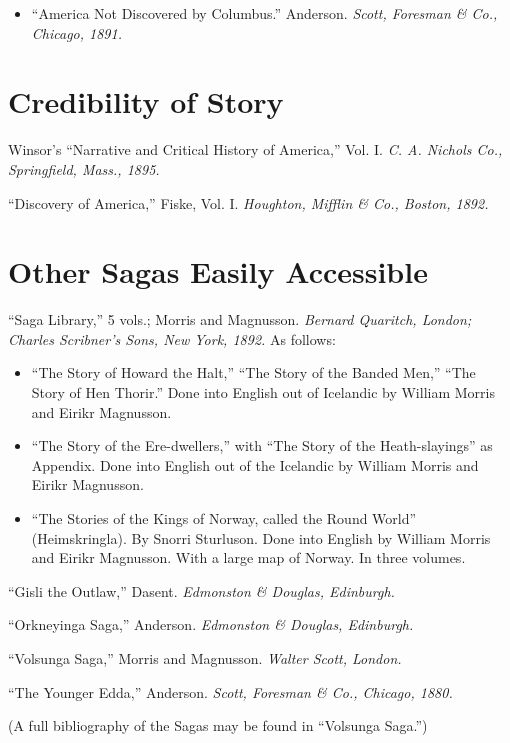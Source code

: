 \begin{itemize}
\item ``America Not Discovered by Columbus.'' Anderson. \emph{Scott, Foresman \&
Co., Chicago, 1891.}
\end{itemize}

\section*{Credibility of Story}

Winsor's ``Narrative and Critical History of America,'' Vol. I. \emph{C.
A. Nichols Co., Springfield, Mass., 1895.}

\noindent ``Discovery of America,'' Fiske, Vol. I. \emph{Houghton,
Mifflin \& Co., Boston, 1892.}

\section*{Other Sagas Easily Accessible}

``Saga Library,'' 5 vols.; Morris and Magnusson. \emph{Bernard Quaritch,
London; Charles Scribner's Sons, New York, 1892.} As follows:

\begin{itemize}[itemsep=0pt]
\item ``The Story of Howard the Halt,'' ``The Story of the Banded Men,'' ``The
Story of Hen Thorir.'' Done into English out of Icelandic by William
Morris and Eirikr Magnusson.
\item ``The Story of the Ere-dwellers,'' with ``The Story of the
Heath-slayings'' as Appendix. Done into English out of the Icelandic
by William Morris and Eirikr Magnusson.
\item ``The Stories of the Kings of Norway, called the Round World''
(Heimskringla). By Snorri Sturluson. Done into English by William
Morris and Eirikr Magnusson. With a large map of Norway. In three
volumes.
\end{itemize}

\noindent ``Gisli the Outlaw,'' Dasent. \emph{Edmonston \& Douglas,
Edinburgh.}

\noindent ``Orkneyinga Saga,'' Anderson. \emph{Edmonston \& Douglas,
Edinburgh.}

\noindent ``Volsunga Saga,'' Morris and Magnusson. \emph{Walter Scott,
London.}

\noindent ``The Younger Edda,'' Anderson. \emph{Scott, Foresman \& Co.,
Chicago, 1880.}

\noindent (A full bibliography of the Sagas may be found in ``Volsunga
Saga.'')

